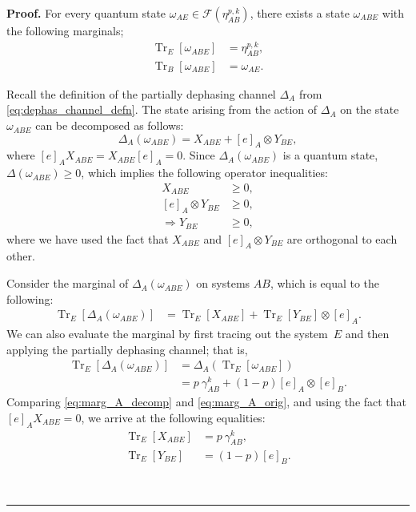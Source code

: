 \documentclass[twocolumn,letterpaper, dvipsnames,allowtoday, accepted = 2025-12-31]{quantumarticle}
\newenvironment{proof}[1][Proof]{\noindent\textbf{#1.} }{\ \rule{0.5em}{0.5em}}
\begin{document}
\begin{proof}
    For every quantum state $\omega_{AE} \in \mathcal{F}\!\left(\eta^{p,k}_{AB}\right)$, there exists a state $\omega_{ABE}$ with the following marginals;
    \begin{align}
        \operatorname{Tr}_E\!\left[\omega_{ABE}\right] &= \eta^{p,k}_{AB},\\
        \operatorname{Tr}_B\!\left[\omega_{ABE}\right] &= \omega_{AE}.
    \end{align}

    Recall the definition of the partially dephasing channel $\Delta_A$ from \eqref{eq:dephas_channel_defn}. 
    The state arising from the action of  $\Delta_A$ on the state $\omega_{ABE}$ can be decomposed as follows:
    \begin{equation}\label{eq:dephas_decomp}
        \Delta_{A}\!\left(\omega_{ABE}\right) = X_{ABE} + [e]_{A}\otimes Y_{BE},
    \end{equation}
    where $[e]_AX_{ABE} = X_{ABE}[e]_A = 0$. Since $\Delta_{A}\!\left(\omega_{ABE}\right)$ is a quantum state, $\Delta\!\left(\omega_{ABE}\right) \ge 0$, which implies the following operator inequalities:
    \begin{align}
        X_{ABE} &\ge 0,\label{eq:X_pos}\\
        [e]_A\otimes Y_{BE} &\ge 0,\\
        \Rightarrow Y_{BE} &\ge 0\label{eq:Y_pos},
    \end{align}
    where we have used the fact that $X_{ABE}$ and $[e]_A\otimes Y_{BE}$ are orthogonal to each other. 
    
    Consider the marginal of $\Delta_{A }\!\left(\omega_{ABE}\right)$ on systems $AB$, which is equal to the following:
    \begin{align}
        \operatorname{Tr}_{E}\!\left[\Delta_{A}\!\left(\omega_{ABE}\right)\right] &=\operatorname{Tr}_{E}\!\left[X_{ABE}\right] + \operatorname{Tr}_{E}\!\left[Y_{BE}\right]\otimes[e]_A.\label{eq:marg_A_decomp}
    \end{align}
    We can also evaluate the marginal by first tracing out the system~$E$ and then applying the partially dephasing channel; that is,
    \begin{align}
        \operatorname{Tr}_{E}\!\left[\Delta_{A}\!\left(\omega_{ABE}\right)\right] &= \Delta_A\left(\operatorname{Tr}_{E}\!\left[\omega_{ABE}\right]\right)\\
        &= p~\gamma^k_{AB} + (1-p)[e]_A\otimes[e]_B.\label{eq:marg_A_orig}
    \end{align}
    Comparing \eqref{eq:marg_A_decomp} and \eqref{eq:marg_A_orig}, and using the fact that $[e]_AX_{ABE} = 0$, we arrive at the following equalities:
    \begin{align}
        \operatorname{Tr}_{E}\!\left[X_{ABE}\right] &= p~\gamma^k_{AB},\label{eq:X_marg}\\
        \operatorname{Tr}_{E}\!\left[Y_{BE}\right] &= (1-p)[e]_B.\label{eq:Y_marg}
    \end{align}
    

\end{proof}
\end{document}
